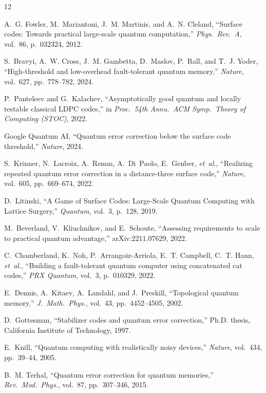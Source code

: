 \documentclass[conference]{IEEEtran}
\begin{document}
\begin{thebibliography}{12}

A.~G. Fowler, M.~Mariantoni, J.~M. Martinis, and A.~N. Cleland, ``Surface codes: Towards practical large-scale quantum computation,'' \emph{Phys.\ Rev.\ A}, vol.~86, p.~032324, 2012.

S.~Bravyi, A.~W. Cross, J.~M. Gambetta, D.~Maslov, P.~Rall, and T.~J. Yoder, ``High-threshold and low-overhead fault-tolerant quantum memory,'' \emph{Nature}, vol.~627, pp.~778--782, 2024.

P.~Panteleev and G.~Kalachev, ``Asymptotically good quantum and locally testable classical LDPC codes,'' in \emph{Proc.\ 54th Annu.\ ACM Symp.\ Theory of Computing (STOC)}, 2022.

Google Quantum AI, ``Quantum error correction below the surface code threshold,'' \emph{Nature}, 2024.

S.~Krinner, N.~Lacroix, A.~Remm, A.~Di~Paolo, E.~Genber, \emph{et~al.}, ``Realizing repeated quantum error correction in a distance-three surface code,'' \emph{Nature}, vol.~605, pp.~669--674, 2022.

D.~Litinski, ``A Game of Surface Codes: Large-Scale Quantum Computing with Lattice Surgery,'' \emph{Quantum}, vol.~3, p.~128, 2019.

M.~Beverland, V.~Kliuchnikov, and E.~Schoute, ``Assessing requirements to scale to practical quantum advantage,'' arXiv:2211.07629, 2022.

C.~Chamberland, K.~Noh, P.~Arrangoiz-Arriola, E.~T. Campbell, C.~T. Hann, \emph{et~al.}, ``Building a fault-tolerant quantum computer using concatenated cat codes,'' \emph{PRX Quantum}, vol.~3, p.~010329, 2022.

E.~Dennis, A.~Kitaev, A.~Landahl, and J.~Preskill, ``Topological quantum memory,'' \emph{J.\ Math.\ Phys.}, vol.~43, pp.~4452--4505, 2002.

D.~Gottesman, ``Stabilizer codes and quantum error correction,'' Ph.D. thesis, California Institute of Technology, 1997.

E.~Knill, ``Quantum computing with realistically noisy devices,'' \emph{Nature}, vol.~434, pp.~39--44, 2005.

B.~M. Terhal, ``Quantum error correction for quantum memories,'' \emph{Rev.\ Mod.\ Phys.}, vol.~87, pp.~307--346, 2015.

\end{thebibliography}
\end{document}
